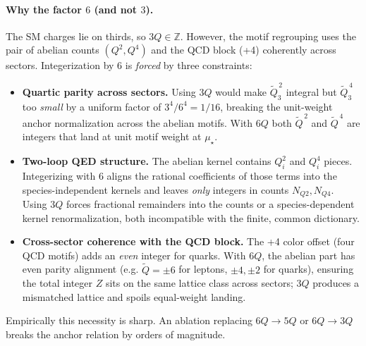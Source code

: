\documentclass[aps,prd,onecolumn,amsmath,amssymb,superscriptaddress,nofootinbib,showpacs,showkeys]{revtex4-2}
\begin{document}
\paragraph{Why the factor $6$ (and not $3$).}
The SM charges lie on thirds, so $3Q\in\mathbb Z$. However, the motif regrouping uses the pair of abelian counts $(Q^2, Q^4)$ and the QCD block (+4) coherently across sectors. Integerization by $6$ is \emph{forced} by three constraints:
\begin{itemize}
  \item \textbf{Quartic parity across sectors.} Using $3Q$ would make $\tilde Q_3^{\,2}$ integral but $\tilde Q_3^{\,4}$ too \emph{small} by a uniform factor of $3^4/6^4=1/16$, breaking the unit-weight anchor normalization across the abelian motifs. With $6Q$ both $\tilde Q^{\,2}$ and $\tilde Q^{\,4}$ are integers that land at unit motif weight at $\mu_\star$.
  \item \textbf{Two-loop QED structure.} The abelian kernel contains $Q_i^2$ and $Q_i^4$ pieces. Integerizing with $6$ aligns the rational coefficients of those terms into the species-independent kernels and leaves \emph{only} integers in counts $N_{Q2},N_{Q4}$. Using $3Q$ forces fractional remainders into the counts or a species-dependent kernel renormalization, both incompatible with the finite, common dictionary.
  \item \textbf{Cross-sector coherence with the QCD block.} The +4 color offset (four QCD motifs) adds an \emph{even} integer for quarks. With $6Q$, the abelian part has even parity alignment (e.g. $\tilde Q=\pm 6$ for leptons, $\pm 4, \pm 2$ for quarks), ensuring the total integer $Z$ sits on the same lattice class across sectors; $3Q$ produces a mismatched lattice and spoils equal-weight landing.
\end{itemize}
Empirically this necessity is sharp. An ablation replacing $6Q\to 5Q$ or $6Q\to 3Q$ breaks the anchor relation by orders of magnitude.
\end{document}
